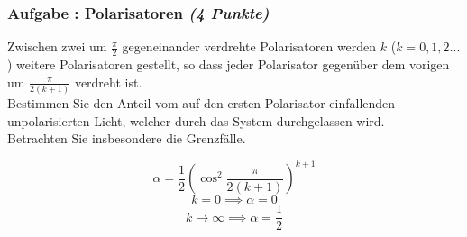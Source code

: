 \documentclass[12pt,a4paper]{article}
\newcounter{numlabel}
\newenvironment{problem}[2]{\stepcounter{numlabel} \vspace{1ex} \subsubsection*{Aufgabe \the\value{numlabel}: #1 \emph{(#2 Punkte)}} \renewcommand{\Currentlabel}{Aufgabe \the\value{numlabel}: #1}}{

}
\begin{document}
\begin{problem}{Polarisatoren}{4}
Zwischen zwei um $\frac{\pi}{2}$ gegeneinander verdrehte Polarisatoren werden $k$ ($k=0,1,2...$)
weitere Polarisatoren gestellt, so dass jeder Polarisator gegenüber dem vorigen um
$\frac{\pi}{2(k+1)}$ verdreht ist.\\
Bestimmen Sie den Anteil vom auf den ersten Polarisator einfallenden unpolarisierten Licht,
welcher durch das System durchgelassen wird.\\
Betrachten Sie insbesondere die Grenzfälle.
\begin{solution}
\[
\alpha=\frac{1}{2}\left( \cos^2\frac{\pi}{2(k+1)} \right)^{k+1}
\]
\[
k=0 \implies \alpha=0
\]
\[
k\to\infty \implies \alpha=\frac{1}{2}
\]
\end{solution}
\end{problem}
\end{document}
